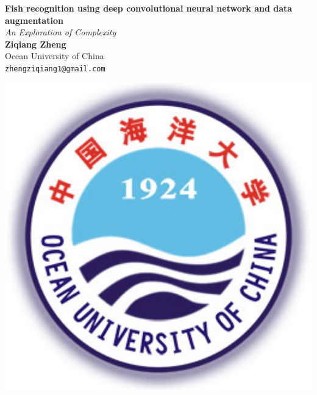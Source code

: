 \documentclass[a0,portrait]{a0poster}
\begin{document}


\begin{minipage}[b]{0.75\linewidth}
\veryHuge \color{NavyBlue} \textbf{Fish recognition using deep convolutional neural network and data augmentation} \color{Black}\\ %
\Huge\textit{An Exploration of Complexity}\\[2cm] %
\huge \textbf{Ziqiang Zheng}\\[0.5cm] %
\huge Ocean University of China\\[0.4cm] %
\Large \texttt{zhengziqiang1@gmail.com}\\
\end{minipage}
%
\begin{minipage}[b]{0.25\linewidth}
\includegraphics[width=20cm]{ouc.jpg}\\
\end{minipage}
\end{document}

